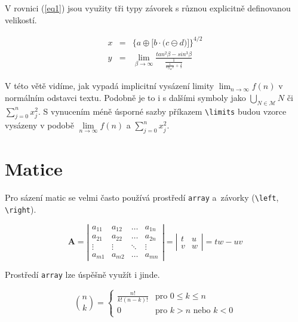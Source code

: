 \documentclass[11pt,twocolumn,a4paper]{article}
\theoremstyle{definition}
\begin{document}
V rovnici (\ref{eq1}) jsou využity tři typy závorek s různou explicitně definovanou velikostí.

\begin{eqnarray}
    \label{eq1}
    x&=&\bigg\{a \oplus \Big[b \cdot \big(c \ominus d\big)\Big]\bigg\}^{4/2}\\
    \label{eq2}
    y&=&\lim_{\beta \to \infty} \frac{tan^2 \beta - sin^3 \beta}{\frac{1}{\frac{1}{log_{42}\,x} + \frac{1}{2}}}
\end{eqnarray}

V této větě vidíme, jak vypadá implicitní vysázení limity $\lim_{n\to\infty} f(n)$ v normálním odstavci textu. Podobně je to i s dalšími symboly jako $\bigcup _{N \in \mathcal{M}} N$ či $\sum _{j=0}^n x_j^2$. 
S vynucením méně úsporné sazby příkazem \verb|\limits| budou vzorce vysázeny v podobě $\lim\limits _{n \to \infty} f(n)$ a $\sum\limits _{j=0}^n x_j^2$. 

\section{Matice}
Pro sázení matic se velmi často používá prostředí \texttt{array} a~závorky (\verb|\left|, \verb|\right|).

\begin{equation*}
    \mathbf{A}=
    \left|
        \begin{array}{cccc}
             a_{11} & a_{12} & \ldots & a_{1n}\\
             a_{21} & a_{22} & \ldots & a_{2n}\\
             \vdots & \vdots & \ddots & \vdots\\
             a_{m1} & a_{m2} & \ldots & a_{mn}
        \end{array}
    \right|
    =
    \left|
        \begin{array}{cc}
             t & u\\
             v & w
        \end{array}
    \right|
    = tw - uv
\end{equation*}

Prostředí \texttt{array} lze úspěšně využít i jinde.

\begin{equation*}
    \binom{n}{k}=
    \left\{
        \begin{array}{cl}
            \frac{n!}{k!(n-k)!}&\text{pro } 0 \leq k \leq n \\
            0&\text{pro } k > n\text{ nebo } k < 0
        \end{array}
    \right.
\end{equation*}
\end{document}
